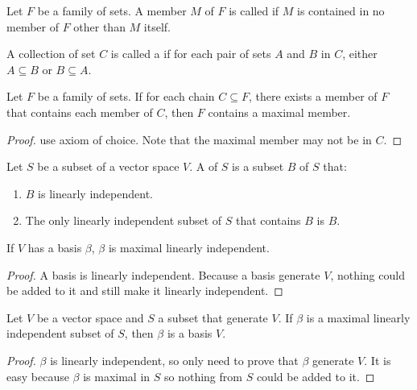 \begin{definition}
    Let $F$ be a family of sets. A member $M$ of $F$ is called  if $M$ is contained in no member of $F$ other than $M$ itself.
\end{definition}

\begin{definition}
    A collection of set $C$ is called a  if for each pair of sets $A$ and $B$ in $C$, either $A \subseteq B$ or $B \subseteq A$.
\end{definition}

\begin{theorem}
    Let $F$ be a family of sets. If for each chain $C \subseteq F$, there exists a member of $F$ that contains each member of $C$, then $F$ contains a maximal member.    
\end{theorem}

\begin{proof}
    use axiom of choice. Note that the maximal member may not be in $C$.
\end{proof}

\begin{definition}
    Let $S$ be a subset of a vector space $V$. A  of $S$ is a subset $B$ of $S$ that:
    \begin{enumerate}
        \item $B$ is linearly independent.
        \item The only linearly independent subset of $S$ that contains $B$ is $B$.
    \end{enumerate}
\end{definition}

\begin{theorem}
    If $V$ has a basis $\beta$, $\beta$ is maximal linearly independent.
\end{theorem}
\begin{proof}
    A basis is linearly independent. Because a basis generate $V$, nothing could be added to it and still make it linearly independent.
\end{proof}



\begin{theorem}
    Let $V$ be a vector space and $S$ a subset that generate $V$. If $\beta$ is a maximal linearly independent subset of $S$, then $\beta$ is a basis $V$.    
\end{theorem}
\begin{proof}
    $\beta$ is linearly independent, so only need to prove that $\beta$ generate $V$. It is easy because $\beta$ is maximal in $S$ so nothing from $S$ could be added to it.
\end{proof}

